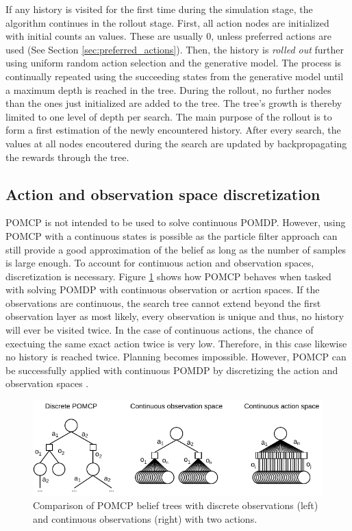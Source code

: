 If any history is visited for the first time during the simulation stage, the algorithm continues in the rollout stage. First, all action nodes are initialized with initial counts an values. These are usually 0, unless preferred actions are used (See Section \ref{sec:preferred_actions}). Then, the history is \textit{rolled out} further using uniform random action selection and the generative model. The process is continually repeated using the succeeding states from the generative model until a maximum depth is reached in the tree. During the rollout, no further nodes than the ones just initialized are added to the tree. The tree's growth is thereby limited to one level of depth per search. The main purpose of the rollout is to form a first estimation of the newly encountered history. After every search, the values at all nodes encoutered during the search are updated by backpropagating the rewards through the tree.

\subsection{Action and observation space discretization}
\label{sec:discretization}

POMCP is not intended to be used to solve continuous POMDP. However, using POMCP with a continuous states is possible as the particle filter approach can still provide a good approximation of the belief as long as the number of samples is large enough. To account for continuous action and observation spaces, discretization is necessary. Figure \ref{fig:pomcp_cont} shows how POMCP behaves when tasked with solving POMDP with continuous observation or acrtion spaces. If the observations are continuous, the search tree cannot extend beyond the first observation layer as most likely, every observation is unique and thus, no history will ever be visited twice. In the case of continuous actions, the chance of exectuing the same exact action twice is very low. Therefore, in this case likewise no history is reached twice. Planning becomes impossible. However, POMCP can be successfully applied with continuous POMDP by discretizing the action and observation spaces \parencite{pomcp_continuous}.

\begin{figure}[htbp]
    \centering
    \includegraphics[width=1.0\textwidth]{figures/pomcp_continuous.pdf}
    \caption[Comparison of POMCP belief trees with discrete observations and continuous observations]{Comparison of POMCP belief trees with discrete observations (left) and continuous observations (right) with two actions.}
    \label{fig:pomcp_cont}
\end{figure}

